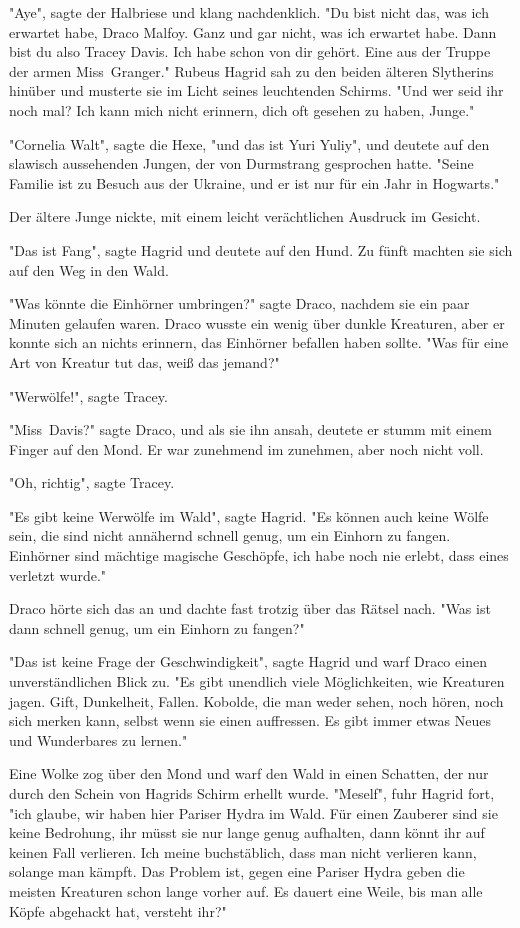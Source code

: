 {"Aye", sagte der Halbriese und klang nachdenklich. "Du bist nicht das, was ich erwartet habe, Draco Malfoy. Ganz und gar nicht, was ich erwartet habe. Dann bist du also Tracey Davis. Ich habe schon von dir gehört. Eine aus der Truppe der armen Miss~Granger." Rubeus Hagrid sah zu den beiden älteren Slytherins hinüber und musterte sie im Licht seines leuchtenden Schirms. "Und wer seid ihr noch mal? Ich kann mich nicht erinnern, dich oft gesehen zu haben, Junge."

"Cornelia Walt", sagte die Hexe, "und das ist Yuri Yuliy", und deutete auf den slawisch aussehenden Jungen, der von Durmstrang gesprochen hatte. "Seine Familie ist zu Besuch aus der Ukraine, und er ist nur für ein Jahr in Hogwarts."

Der ältere Junge nickte, mit einem leicht verächtlichen Ausdruck im Gesicht.

"Das ist Fang", sagte Hagrid und deutete auf den Hund. Zu fünft machten sie sich auf den Weg in den Wald.

"Was könnte die Einhörner umbringen?" sagte Draco, nachdem sie ein paar Minuten gelaufen waren. Draco wusste ein wenig über dunkle Kreaturen, aber er konnte sich an nichts erinnern, das Einhörner befallen haben sollte. "Was für eine Art von Kreatur tut das, weiß das jemand?"

"Werwölfe!", sagte Tracey.

"Miss~Davis?" sagte Draco, und als sie ihn ansah, deutete er stumm mit einem Finger auf den Mond. Er war zunehmend im zunehmen, aber noch nicht voll.

"Oh, richtig", sagte Tracey.

"Es gibt keine Werwölfe im Wald", sagte Hagrid. "Es können auch keine Wölfe sein, die sind nicht annähernd schnell genug, um ein Einhorn zu fangen. Einhörner sind mächtige magische Geschöpfe, ich habe noch nie erlebt, dass eines verletzt wurde."

Draco hörte sich das an und dachte fast trotzig über das Rätsel nach. "Was ist dann schnell genug, um ein Einhorn zu fangen?"

"Das ist keine Frage der Geschwindigkeit", sagte Hagrid und warf Draco einen unverständlichen Blick zu. "Es gibt unendlich viele Möglichkeiten, wie Kreaturen jagen. Gift, Dunkelheit, Fallen. Kobolde, die man weder sehen, noch hören, noch sich merken kann, selbst wenn sie einen auffressen. Es gibt immer etwas Neues und Wunderbares zu lernen."

Eine Wolke zog über den Mond und warf den Wald in einen Schatten, der nur durch den Schein von Hagrids Schirm erhellt wurde. "Meself", fuhr Hagrid fort, "ich glaube, wir haben hier Pariser Hydra im Wald. Für einen Zauberer sind sie keine Bedrohung, ihr müsst sie nur lange genug aufhalten, dann könnt ihr auf keinen Fall verlieren. Ich meine buchstäblich, dass man nicht verlieren kann, solange man kämpft. Das Problem ist, gegen eine Pariser Hydra geben die meisten Kreaturen schon lange vorher auf. Es dauert eine Weile, bis man alle Köpfe abgehackt hat, versteht ihr?"

}
